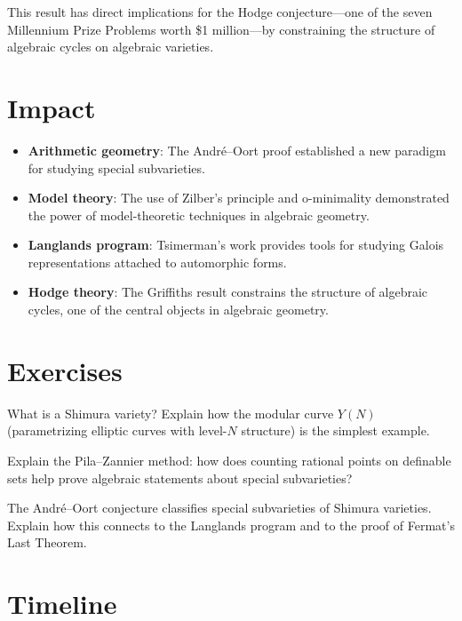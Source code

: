 This result has direct implications for the Hodge conjecture---one of the seven Millennium Prize Problems worth \$1 million---by constraining the structure of algebraic cycles on algebraic varieties.

\section{Impact}
\begin{itemize}
\item \textbf{Arithmetic geometry}: The André--Oort proof established a new paradigm for studying special subvarieties.
\item \textbf{Model theory}: The use of Zilber's principle and o-minimality demonstrated the power of model-theoretic techniques in algebraic geometry.
\item \textbf{Langlands program}: Tsimerman's work provides tools for studying Galois representations attached to automorphic forms.
\item \textbf{Hodge theory}: The Griffiths result constrains the structure of algebraic cycles, one of the central objects in algebraic geometry.
\end{itemize}

\section{Exercises}

\begin{exercise}[Basic]
What is a Shimura variety? Explain how the modular curve $Y(N)$ (parametrizing elliptic curves with level-$N$ structure) is the simplest example.
\end{exercise}

\begin{exercise}[Intermediate]
Explain the Pila--Zannier method: how does counting rational points on definable sets help prove algebraic statements about special subvarieties?
\end{exercise}

\begin{exercise}[Challenge]
The André--Oort conjecture classifies special subvarieties of Shimura varieties. Explain how this connects to the Langlands program and to the proof of Fermat's Last Theorem.
\end{exercise}

\section{Timeline}


